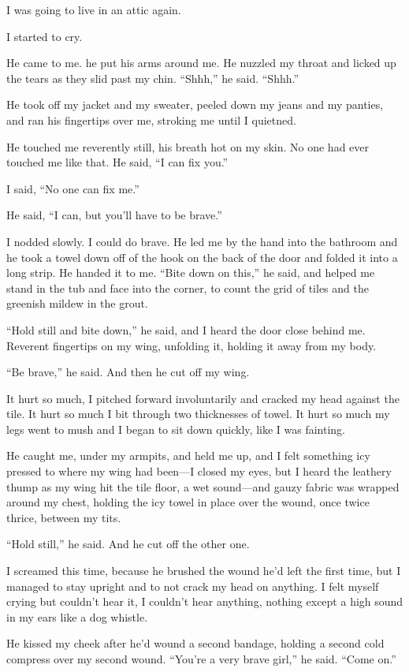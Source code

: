 I was going to live in an attic again.

I started to cry.

He came to me.  he put his arms around me.  He nuzzled my throat and
licked up the tears as they slid past my chin.  ``Shhh,'' he said. 
``Shhh.''

He took off my jacket and my sweater, peeled down my jeans and my
panties, and ran his fingertips over me, stroking me until I quietned.

He touched me reverently still, his breath hot on my skin.  No one had
ever touched me like that.  He said, ``I can fix you.''

I said, ``No one can fix me.''

He said, ``I can, but you'll have to be brave.''

I nodded slowly.  I could do brave.  He led me by the hand into the
bathroom and he took a towel down off of the hook on the back of the
door and folded it into a long strip.  He handed it to me.  ``Bite
down on this,'' he said, and helped me stand in the tub and face into
the corner, to count the grid of tiles and the greenish mildew in the
grout.

``Hold still and bite down,'' he said, and I heard the door close
behind me.  Reverent fingertips on my wing, unfolding it, holding it
away from my body.

``Be brave,'' he said.  And then he cut off my wing.

It hurt so much, I pitched forward involuntarily and cracked my head
against the tile.  It hurt so much I bit through two thicknesses of
towel.  It hurt so much my legs went to mush and I began to sit down
quickly, like I was fainting.

He caught me, under my armpits, and held me up, and I felt something
icy pressed to where my wing had been---I closed my eyes, but I heard
the leathery thump as my wing hit the tile floor, a wet sound---and
gauzy fabric was wrapped around my chest, holding the icy towel in
place over the wound, once twice thrice, between my tits.

``Hold still,'' he said.  And he cut off the other one.

I screamed this time, because he brushed the wound he'd left the first
time, but I managed to stay upright and to not crack my head on
anything.  I felt myself crying but couldn't hear it, I couldn't hear
anything, nothing except a high sound in my ears like a dog whistle.

He kissed my cheek after he'd wound a second bandage, holding a second
cold compress over my second wound.  ``You're a very brave girl,'' he
said.  ``Come on.''

